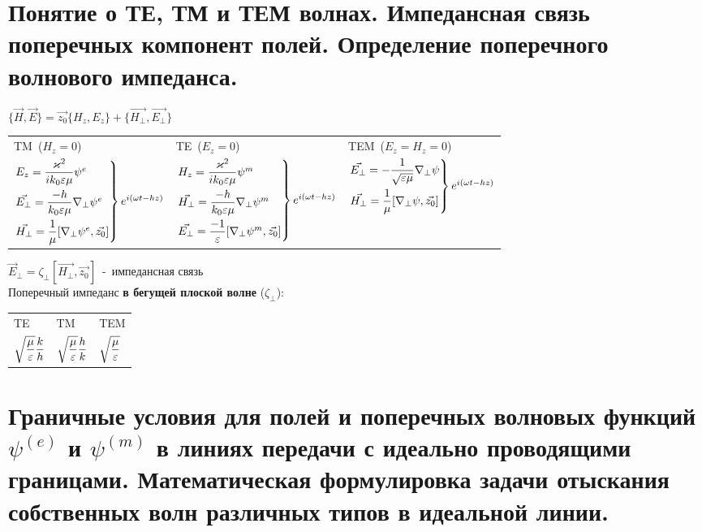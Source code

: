 \begin{multicols*}{2}
		\section{Понятие о ТЕ, ТМ и ТЕМ волнах. Импедансная связь поперечных компонент полей. Определение поперечного волнового импеданса. }
		
		$\{\vec{H},\vec{E}\}=\vec{z_0}\{{H_z},{E_z}\}+\{\vec{H_\perp},\vec{E_\perp}\}$ \\
		\begin{tabular}{l l l}
			TM~($H_z=0$) & TE~($E_z=0$) & TEM~($E_z=H_z=0$) \\
			$\begin{rcases}
				E_z=\dfrac{\varkappa^2}{ik_0\varepsilon\mu}\psi^e \\
				\vec{E_\perp} = \dfrac{-h}{k_0\varepsilon\mu}\nabla_\perp\psi^e \\
				\vec{H_\perp}=\dfrac1{\mu}[\nabla_\perp\psi^e,\vec{z_0}]
			\end{rcases} e^{i(\omega t-hz)}$ & 
			$\begin{rcases}
				H_z=\dfrac{\varkappa^2}{ik_0\varepsilon\mu}\psi^m \\
				\vec{H_\perp} = \dfrac{-h}{k_0\varepsilon\mu}\nabla_\perp\psi^m \\
				\vec{E_\perp}=\dfrac{-1}{\varepsilon}[\nabla_\perp\psi^m,\vec{z_0}]
			\end{rcases} e^{i(\omega t-hz)}$ & 
			$\begin{rcases}
				\vec{E_\perp} =-\dfrac1{\sqrt{\varepsilon\mu}}\nabla_\perp\psi \\
				\vec{H_\perp}=\dfrac1{\mu}[\nabla_\perp\psi,\vec{z_0}]
			\end{rcases} e^{i(\omega t-hz)}$ \\
		\end{tabular}
		$\vec{E}_\perp=\zeta_\perp[\vec{H_\perp},\vec{z_0}]$~-~импедансная связь \\
		Поперечный импеданс \textbf{в бегущей плоской волне} ($\zeta_\perp$): \\
		\begin{tabular}{l l l}
			TE & TM & TEM \\
			$\sqrt{\dfrac{\mu}{\varepsilon}}\dfrac kh$ & $\sqrt{\dfrac{\mu}{\varepsilon}}\dfrac hk$ & $\sqrt{\dfrac{\mu}{\varepsilon}}$ \\
		\end{tabular}
		
		\section{Граничные условия для полей и поперечных волновых функций $\psi^{(e)}$ и $\psi^{(m)}$ в линиях передачи с идеально проводящими границами. Математическая формулировка задачи отыскания собственных волн различных типов в идеальной линии.}
		

\end{multicols*}
